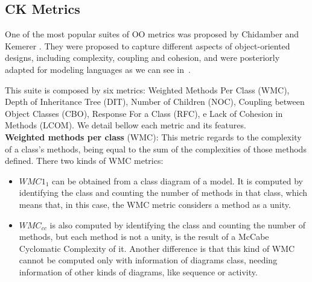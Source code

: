 \subsection{\textrm{CK} Metrics}


One of the most popular suites of OO metrics was proposed by Chidamber and Kemerer \cite{Chidamber:1994:MSO:630808.631131}.
They were proposed to capture different aspects of object-oriented designs, including complexity, coupling and cohesion, and were posteriorly adapted for modeling languages as we can see in~\cite{Power2}.

This suite is composed by six metrics: Weighted Methods Per Class (WMC), Depth of Inheritance Tree (DIT), Number of Children (NOC), Coupling between Object Classes (CBO), Response For a Class (RFC), e Lack of Cohesion in Methods (LCOM).
We detail bellow each metric and its features.\\

\textbf{Weighted methods per class} (WMC): This metric regards to the complexity of a class's methods, being equal to the sum of the complexities of those methods defined. There two kinds of WMC metrics:
\begin{itemize}
\item \textbf{$WMC1_{1}$} can be obtained from a class diagram of a \umlS model. It is computed by identifying the class and counting the number of methods in that class, which means that, in this case, the WMC metric considers a method as a unity.
\item \textbf{$WMC_{cc}$} is also computed by identifying the class and counting the number of methods, but each method is not a unity, is the result of a McCabe Cyclomatic Complexity of it. Another difference is that this kind of WMC cannot be computed only with information of diagrams class, needing information of other kinds of diagrams, like sequence or activity.
\end{itemize}

